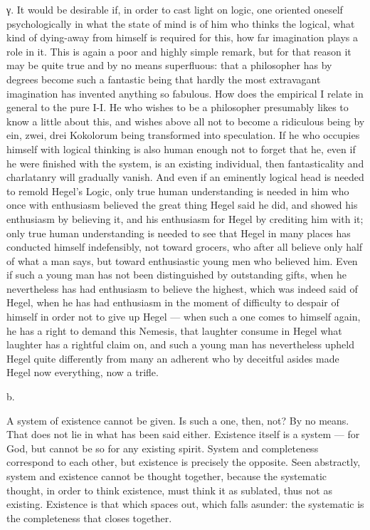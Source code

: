 \documentclass[12pt,a4paper,openany]{book}
\newcommand{\opage}[1]{\marginnote{\footnotesize\textit{[#1]}}}
\begin{document}
γ. It would be desirable if, in order to cast light on logic, one oriented oneself
psychologically in what the state of mind is of him who thinks the logical, what kind
of dying-away from himself is required for this, how far imagination plays a role
in it. This is again a poor and highly simple remark, but for that reason it may be
quite true and by no means superfluous: that a philosopher has by degrees become such
a fantastic being that hardly the most extravagant imagination has invented anything
so fabulous. How does the empirical I relate in general to the pure I-I. He who
wishes to be a philosopher presumably likes to know a little about this, and wishes
above all not to become a ridiculous being by ein, zwei, drei Kokolorum being
transformed into speculation. If he who occupies himself with logical thinking is
also human enough not to forget that he, even if he were finished with the system, is
an
\setcounter{footnote}{0}%
\opage{179}existing individual, then fantasticality and charlatanry will gradually vanish.
And even if an eminently logical head is needed to remold Hegel's Logic, only true
human understanding is needed in him who once with enthusiasm believed the great
thing Hegel said he did, and showed his enthusiasm by believing it, and his
enthusiasm for Hegel by crediting him with it; only true human understanding is
needed to see that Hegel in many places has conducted himself indefensibly, not
toward grocers, who after all believe only half of what a man says, but toward
enthusiastic young men who believed him. Even if such a young man has not been
distinguished by outstanding gifts, when he nevertheless has had enthusiasm to
believe the highest, which was indeed said of Hegel, when he has had enthusiasm in the
moment of difficulty to despair of himself in order not to give up Hegel --- when such
a one comes to himself again, he has a right to demand this Nemesis, that laughter
consume in Hegel what laughter has a rightful claim on, and such a young man has
nevertheless upheld Hegel quite differently from many an adherent who by deceitful
asides made Hegel now everything, now a trifle.

\begin{center}b.\end{center}

A system of existence cannot be given. Is such a one, then, not? By no means. That
does not lie in what has been said either. Existence itself is a system --- for God,
but cannot be so for any existing spirit. System and completeness correspond to each
other, but existence is precisely the opposite. Seen abstractly, system and existence
cannot be thought together, because the systematic thought, in order to think
existence, must think it as sublated, thus not as existing. Existence is that which
spaces out, which falls asunder: the systematic is the completeness that closes
together.
\end{document}
